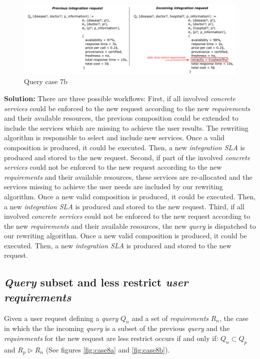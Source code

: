 \begin{figure}[h!]
\center
\includegraphics[scale=0.85]{figures/query-case-7b.pdf}\caption{Query case 7b} \label{fig:case7b}
\end{figure}

\bigskip
\noindent \textbf{Solution:} There are three possible workflows: First, if all involved \textsl{concrete services} could be enforced to the new request according to the new \textsl{requirements} and their available resources, the previous composition could be extended to include the services which are missing to achieve the user results. The rewriting algorithm is responsible to select and include new services. Once a valid composition is produced, it could be executed. Then, a new \textsl{integration SLA} is produced and stored to the new request. Second, if part of the involved \textsl{concrete services} could not be enforced to the new request according to the new \textsl{requirements} and their available resources, these services are re-allocated and the services missing to achieve the user needs are included by our rewriting algorithm. Once a new valid composition is produced, it could be executed. Then, a new \textsl{integration SLA} is produced and stored to the new request. Third, if all involved \textsl{concrete services} could not be enforced to the new request according to the new \textsl{requirements} and their available resources, the new \textsl{query} is dispatched to our rewriting algorithm. Once a new valid composition is produced, it could be executed. Then, a new \textsl{integration SLA} is produced and stored to the new request.

\subsection{\textsl{Query} subset and less restrict \textsl{user requirements}}
Given a user request defining a \textsl{query} $Q_{n}$ and a set of \textsl{requirements} $R_{n}$, the case in which the the incoming \textsl{query} is a subset of the previous \textsl{query} and the \textsl{requirements} for the new request are less restrict occurs if and only if: $Q_{n} \subset Q_{p}$ and $R_{p} \triangleright R_{n}$ (See figures \ref{fig:case8a} and \ref{fig:case8b}).

